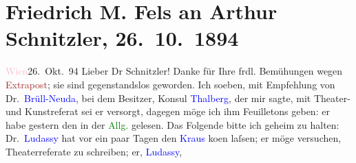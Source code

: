 

               \section[Friedrich M. Fels an Arthur Schnitzler, 26. 10. 1894]{ Friedrich M. Fels an Arthur Schnitzler, 26. 10. 1894}\nopagebreak{}\rehead{ }\normalsize\beginnumbering{} \toendnotes[C]{\smallbreak\pagebreak[2]} 
\toendnotes[C]{\smallbreak}\pstart
           \raggedleft{}{\pb}\textcolor{pink}{Wien}{}\ledrightnote{\textcolor{pink}{Wien}}{ }26. Okt. 94\pend
           \pstart{}Lieber Dr Schnitzler!\pend\pstart
           Danke für Ihre frdl. Bemühungen wegen \textcolor{brown}{Extrapost}{}\ledrightnote{\textcolor{brown}{Extrapost}};
                    sie sind gegenstandslos geworden. Ich soeben, mit Empfehlung von Dr. \textcolor{blue}{Brüll-Neuda}{}\ledrightnote{\textcolor{blue}{Wilhelm Brüll-Neuda}}, bei dem Besitzer, Konsul \textcolor{blue}{Thalberg}{}\ledrightnote{\textcolor{blue}{Josef Thalberg}}, der mir sagte, mit Theater- und
                    Kunstreferat sei er versorgt, dagegen möge ich ihm Feuilletons geben: er habe
                    gestern den \label{K_L00393_1v}\label{K_L00393_1h} in der \textcolor{green}{Allg.}{}\ledrightnote{\textcolor{green}{Wiener Allgemeine Zeitung}} gelesen.\pend
           \pstart
           Das Folgende bitte ich geheim zu halten: Dr. \textcolor{blue}{Ludassy}{}\ledrightnote{\textcolor{blue}{Julius von Gans-Ludassy}} hat vor ein paar Tagen den \textcolor{blue}{Kraus}{}\ledrightnote{\textcolor{blue}{Karl Kraus}} ko{\geminationm}en laſsen; er möge versuchen,
                    Theaterreferate zu schreiben; er, \textcolor{blue}{Ludassy}{}\ledrightnote{\textcolor{blue}{Julius von Gans-Ludassy}},
